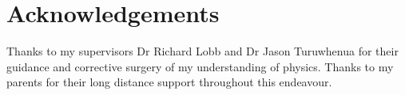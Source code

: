 \chapter{Acknowledgements}
Thanks to my supervisors Dr Richard Lobb and Dr Jason Turuwhenua for their guidance
and corrective surgery of my understanding of physics. Thanks to my parents for
their long distance support throughout this endeavour.
